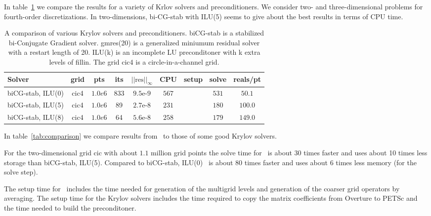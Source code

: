 In table~\ref{tab:krylovSolvers} we compare the results for a variety of Krlov solvers and preconditioners.
We consider two- and three-dimensional problems for fourth-order discretizations.
In two-dimensions, bi-CG-stab with ILU(5) seems to give about the best results in terms of CPU time.


\newcommand{\maxNorm}[1]{\vert\vert #1 \vert\vert_\infty}
\newcommand{\maxRes}{\maxNorm{\mbox{res}}}

\begin{table}[hbt]
\begin{center}
\begin{tabular}{|l|c|c|c|c|c|c|c|c|} \hline 
 Solver             & grid     & pts     & its   & $\maxRes$   & CPU    &  setup & solve  & reals/pt\\   \hline 
%						   	       
 biCG-stab, ILU(0)  & cic4     & $1.0e6$ &  833  & $9.5$e-$9$  &$ 567$  &  $  $  &$ 531$  & $ 50.1$    \\
 biCG-stab, ILU(5)  & cic4     & $1.0e6$ &   89  & $2.7$e-$8$  & $231$  &  $  $  & $180$  & $100.0$    \\
 biCG-stab, ILU(8)  & cic4     & $1.0e6$ &   64  & $5.6$e-$8$  & $258$  &  $  $  & $179$  & $149.0$    \\
%
\hline 
\end{tabular}
\end{center}
\caption{A comparison of various Krylov solvers and preconditioners. biCG-stab is a stabilized bi-Conjugate Gradient
solver. gmres(20) is a generalized miniumum residual solver with a restart length of 20. ILU(k) is an
incomplete LU preconditoner with k extra levels of fillin. The grid cic4 is a circle-in-a-channel
grid.}
\label{tab:krylovSolvers} 
\end{table}



In table~\ref{tab:comparison} we compare results from \Ogmg\ to those of some good Krylov solvers. 


For the two-dimensional grid cic with about $1.1$ million grid points the solve time for 
\Ogmg\ is about 30 times faster
and uses about 10 times less storage than biCG-stab, ILU(5). Compared to biCG-stab, ILU(0) \Ogmg\
is about 80 times faster and uses about 6 times less memory (for the solve step).

The setup time for \Ogmg\ includes the time needed for generation of the multigrid levels and generation
of the coarser grid operators by averaging. The setup time for the Krylov solvers includes
the time required to copy the matrix coefficients from Overture to PETSc and the time needed
to build the preconditoner.

